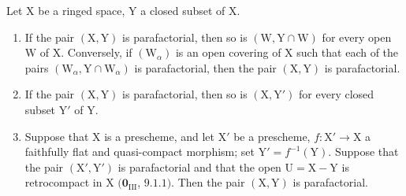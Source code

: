 \begin{corollary}[21.13.6]
\label{IV.21.13.6}
Let $\mathrm{X}$ be a ringed space, $\mathrm{Y}$ a closed subset of $\mathrm{X}$.
\begin{enumerate}[label=(\roman*)]
  \item If the pair $(\mathrm{X},\mathrm{Y})$ is parafactorial, then so is $(\mathrm{W},\mathrm{Y}\cap\mathrm{W})$ for every open $\mathrm{W}$ of $\mathrm{X}$.
  Conversely, if $(\mathrm{W}_\alpha)$ is an open covering of $\mathrm{X}$ such that each of the pairs $(\mathrm{W}_\alpha,\mathrm{Y}\cap\mathrm{W}_\alpha)$ is parafactorial, then the pair $(\mathrm{X},\mathrm{Y})$ is parafactorial.
  \item If the pair $(\mathrm{X},\mathrm{Y})$ is parafactorial, then so is $(\mathrm{X},\mathrm{Y}')$ for every closed subset $\mathrm{Y}'$ of $\mathrm{Y}$.
  \item Suppose that $\mathrm{X}$ is a prescheme, and let $\mathrm{X}'$ be a prescheme, $f:\mathrm{X}'\to\mathrm{X}$ a faithfully flat and quasi-compact morphism; set $\mathrm{Y}'=f^{-1}(\mathrm{Y})$.
  Suppose that the pair $(\mathrm{X}',\mathrm{Y}')$ is parafactorial and that the open $\mathrm{U}=\mathrm{X}-\mathrm{Y}$ is retrocompact in $\mathrm{X}$ $(\mathbf{0}_{\mathrm{III}}$, $9.1.1)$.
  Then the pair $(\mathrm{X},\mathrm{Y})$ is parafactorial.
\end{enumerate}
\end{corollary}

